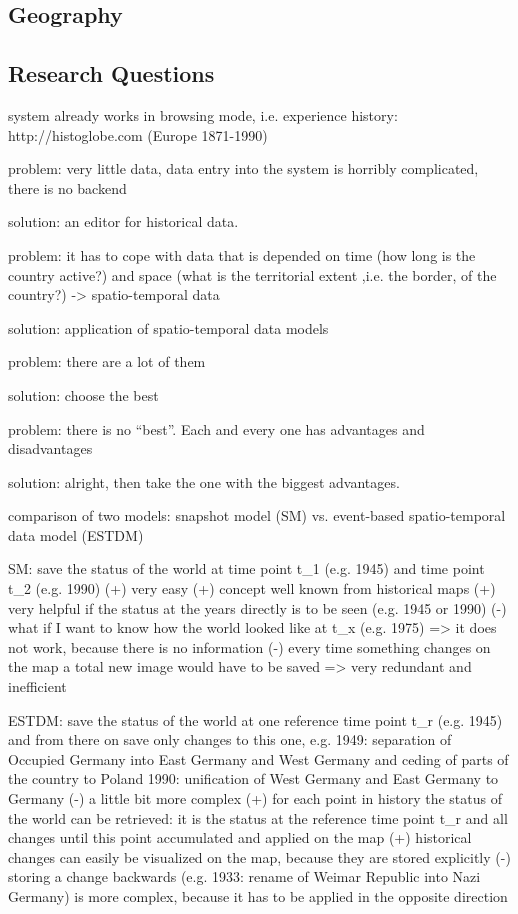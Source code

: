 

\subsection{Geography} %
\label{sub:geography}



\subsection{Research Questions} %
\label{sub:research_questions}




system already works in browsing mode, i.e. experience history:
http://histoglobe.com
(Europe 1871-1990)

problem: very little data, data entry into the system is horribly complicated, there is no backend

solution: an editor for historical data.

problem: it has to cope with data that is depended on time (how long is the country active?) and space (what is the territorial extent ,i.e. the border, of the country?) -> spatio-temporal data

solution: application of spatio-temporal data models

problem: there are a lot of them

solution: choose the best

problem: there is no ``best''. Each and every one has advantages and disadvantages

solution: alright, then take the one with the biggest advantages.

comparison of two models: snapshot model (SM) vs. event-based spatio-temporal data model (ESTDM)

SM: save the status of the world at time point t\_1 (e.g. 1945) and time point t\_2 (e.g. 1990)
(+) very easy
(+) concept well known from historical maps
(+) very helpful if the status at the years directly is to be seen (e.g. 1945 or 1990)
(-) what if I want to know how the world looked like at t\_x (e.g. 1975)
=> it does not work, because there is no information
(-) every time something changes on the map a total new image would have to be saved
=> very redundant and inefficient

ESTDM: save the status of the world at one reference time point t\_r (e.g. 1945) and from there on save only changes to this one, e.g.
1949: separation of Occupied Germany into East Germany and West Germany and ceding of parts of the country to Poland
1990: unification of West Germany and East Germany to Germany
(-) a little bit more complex
(+) for each point in history the status of the world can be retrieved: it is the status at the reference time point t\_r and all changes until this point accumulated and applied on the map
(+) historical changes can easily be visualized on the map, because they are stored explicitly
(-) storing a change backwards (e.g. 1933: rename of Weimar Republic into Nazi Germany) is more complex, because it has to be applied in the opposite direction

